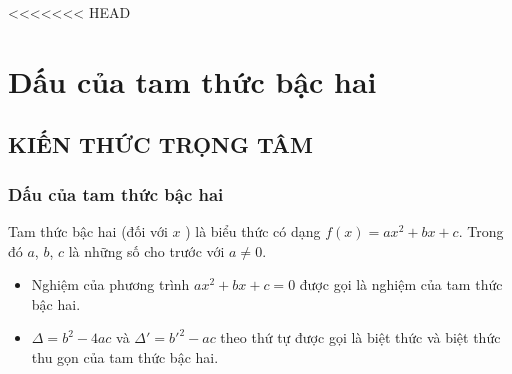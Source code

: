 <<<<<<< HEAD
\setcounter{dang}{0}%
\setcounter{section}{2}
\section{Dấu của tam thức bậc hai}
\subsection{KIẾN THỨC TRỌNG TÂM}
\subsubsection{Dấu của tam thức bậc hai}
\begin{dn}
	Tam thức bậc hai (đối với $x$ ) là biểu thức có dạng $f(x)=ax^2+bx+c$. Trong đó $a$, $b$, $c$ là những số cho trước với $a\ne 0$.
\end{dn}
\begin{note}
	\begin{itemize}
		\item Nghiệm của phương trình $ax^2+bx+c=0$ được gọi là nghiệm của tam thức bậc hai.
		\item $ \Delta =b^2-4ac$ và $ \Delta '=b'^2-ac$ theo thứ tự được gọi là biệt thức và biệt thức thu gọn của tam thức bậc hai.
	\end{itemize}
\end{note}


